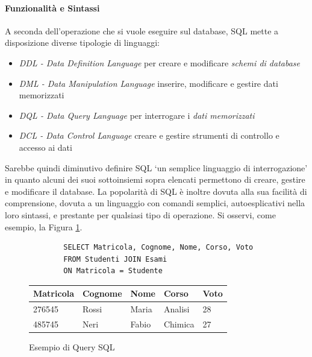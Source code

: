 \paragraph{Funzionalità e Sintassi} A seconda dell'operazione che si vuole eseguire sul database, SQL mette a disposizione diverse tipologie di linguaggi:
\begin{itemize}
    \item \textit{DDL - Data Definition Language} per creare e modificare \emph{schemi di database}
    \item \textit{DML - Data Manipulation Language} inserire, modificare e gestire dati memorizzati
    \item \textit{DQL - Data Query Language} per interrogare i \emph{dati memorizzati}
    \item \textit{DCL - Data Control Language} creare e gestire strumenti di controllo e accesso ai dati
\end{itemize}
Sarebbe quindi diminutivo definire SQL `un semplice linguaggio di interrogazione' in quanto alcuni dei suoi sottoinsiemi sopra elencati permettono di creare, gestire e modificare il database. La popolarità di SQL è inoltre dovuta alla sua facilità di comprensione, dovuta a un linguaggio con comandi semplici, autoesplicativi nella loro sintassi, e prestante per qualsiasi tipo di operazione. Si osservi, come esempio, la Figura \ref{fig:sql-example}.
\begin{figure}[H]
    \centering
    \begin{verbatim}
        SELECT Matricola, Cognome, Nome, Corso, Voto 
        FROM Studenti JOIN Esami 
        ON Matricola = Studente
    \end{verbatim}
    \begin{table}[H]
        \centering
        \begin{tabular}{ |p{2cm}||p{2cm}|p{2cm}|p{2cm}|p{2cm}|  }
            \hline
            Matricola & Cognome & Nome  & Corso   & Voto \\
            \hline
            276545    & Rossi   & Maria & Analisi & 28   \\
            485745    & Neri    & Fabio & Chimica & 27   \\
            \hline
        \end{tabular}
    \end{table}
    \caption{Esempio di Query SQL}
    \label{fig:sql-example}
\end{figure}


